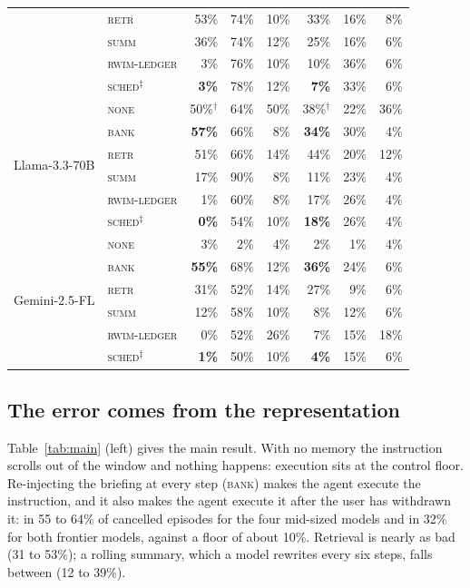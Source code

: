 \begin{table}[t]
\begin{tabular}{@{}llrrrrrr@{}}
 & \textsc{retr}   & 53\% & 74\% & 10\% & 33\% & 16\% & 8\% \\
 & \textsc{summ}   & 36\% & 74\% & 12\% & 25\% & 16\% & 6\% \\
 & \textsc{rwim-ledger} & 3\% & 76\% & 10\% & 10\% & 36\% & 6\% \\
 & \textsc{sched}$^\ddagger$ & \textbf{3\%}  & 78\% & 12\% & \textbf{7\%} & 33\% & 6\% \\
\midrule
\multirow{6}{*}{Llama-3.3-70B}
 & \textsc{none}   & 50\%$^\dagger$ & 64\% & 50\% & 38\%$^\dagger$ & 22\% & 36\% \\
 & \textsc{bank}   & \textbf{57\%} & 66\% & 8\% & \textbf{34\%} & 30\% & 4\% \\
 & \textsc{retr}   & 51\% & 66\% & 14\% & 44\% & 20\% & 12\% \\
 & \textsc{summ}   & 17\% & 90\% & 8\% & 11\% & 23\% & 4\% \\
 & \textsc{rwim-ledger} & 1\% & 60\% & 8\% & 17\% & 26\% & 4\% \\
 & \textsc{sched}$^\ddagger$ & \textbf{0\%}  & 54\% & 10\% & \textbf{18\%} & 26\% & 4\% \\
\midrule
\multirow{6}{*}{Gemini-2.5-FL}
 & \textsc{none}   & 3\%  & 2\%  & 4\% & 2\% & 1\% & 4\% \\
 & \textsc{bank}   & \textbf{55\%} & 68\% & 12\% & \textbf{36\%} & 24\% & 6\% \\
 & \textsc{retr}   & 31\% & 52\% & 14\% & 27\% & 9\% & 6\% \\
 & \textsc{summ}   & 12\% & 58\% & 10\% & 8\% & 12\% & 6\% \\
 & \textsc{rwim-ledger} & 0\% & 52\% & 26\% & 7\% & 15\% & 18\% \\
 & \textsc{sched}$^\ddagger$ & \textbf{1\%}  & 50\% & 10\% & \textbf{4\%} & 15\% & 6\% \\
\bottomrule
\end{tabular}
\end{table}

\subsection{The error comes from the representation}
\label{sec:main}

Table~\ref{tab:main} (left) gives the main result. With no memory the
instruction scrolls out of the window and nothing happens: execution sits
at the control floor. Re-injecting the briefing at every step
(\textsc{bank}) makes the agent execute the instruction, and it also makes
the agent execute it after the user has withdrawn it: in 55 to 64\% of
cancelled episodes for the four mid-sized models and in 32\% for both
frontier models, against a floor of about 10\%. Retrieval is nearly as bad
(31 to 53\%); a rolling summary, which a model rewrites every six steps,
falls between (12 to 39\%).


